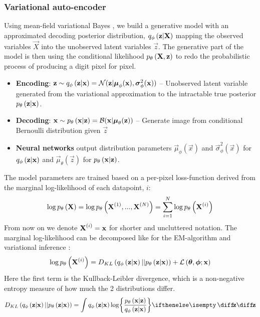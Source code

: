 \subsubsection{Variational auto-encoder}
\label{ssub:vae}

Using mean-field variational Bayes \cite{Kingma2013}, we build a generative model with an approximated decoding posterior distribution, $q_{\phi}\left(\bm{\mathrm{z}}|\bm{\mathrm{X}}\right)$ mapping the observed variables $\vec{X}$ into the unobserved latent variables $\vec{z}$. The generative part of the model is then using the conditional likelihood $p_{\theta}\left(\bm{\mathrm{X}},\bm{\mathrm{z}}\right)$ to redo the probabilistic process of producing a digit pixel for pixel. \\  

\begin{itemize}
	\item \textbf{Encoding}: $\bm{\mathrm{z}} \sim q_{\phi}\left(\bm{\mathrm{z}}|\bm{\mathrm{x}}\right) = \mathcal{N}( \bm{\mathrm{z}}|\bm{\mathrm{\mu}}_\phi(\bm{\mathrm{x}}),\bm{\mathrm{\sigma}}^2_\phi(\bm{\mathrm{x}}))$ -- Unobserved latent variable generated from the variational approximation to the intractable true posterior $p_{\theta}\left(\bm{\mathrm{z}}|\bm{\mathrm{x}}\right)$.
	\item \textbf{Decoding}: $\bm{\mathrm{x}} \sim p_{\theta}\left(\bm{\mathrm{x}}|\bm{\mathrm{z}}\right)=\mathcal{B}( \bm{\mathrm{x}}|\bm{\mathrm{\mu}}_\theta(\bm{\mathrm{z}}))$ -- Generate image from conditional Bernoulli distribution given $\vec{z}$
	\item \textbf{Neural networks} output distribution parameters $\vec{\mu}_\phi(\vec{x})$ and $\vec{\sigma}^2_\phi(\vec{x})$ for $q_{\phi}\left(\bm{\mathrm{z}}|\bm{\mathrm{x}}\right)$ and $\vec{\mu}_\theta(\vec{z})$ for $p_{\theta}\left(\bm{\mathrm{x}}|\bm{\mathrm{z}}\right)$.	
\end{itemize}

The model parameters are trained based on a per-pixel loss-function derived from the marginal log-likelihood of each datapoint, $i$:
\begin{equation}
	\log p_{\theta}\left(\bm{\mathrm{X}}\right) = \log p_{\theta}\left(\bm{\mathrm{X}}^{(1)}, ..., \bm{\mathrm{X}}^{(N)}\right) = \sum^N_{i=1} \log p_{\theta}\left(\bm{\mathrm{X}}^{(i)}\right) 
\end{equation}
From now on we denote $\bm{\mathrm{X}}^{(i)} = \bm{\mathrm{x}}$ for shorter and uncluttered notation.
The marginal log-likelihood can be decomposed like for the EM-algorithm and variational inference \cite[\S10.2]{Bishop2006}:
\begin{equation}
	\log p_{\theta}\left(\bm{\mathrm{X}}^{(i)}\right) = D_{KL}\left( q_{\phi}\left(\bm{\mathrm{z}}|\bm{\mathrm{x}}\right)||p_{\theta}\left(\bm{\mathrm{z}}|\bm{\mathrm{x}}\right)\right) + \mathcal{L}\left(\bm{\mathrm{\theta}},\bm{\mathrm{\phi}};\bm{\mathrm{x}}\right)
\end{equation} 
Here the first term is the Kullback-Leibler divergence, which is a non-negative entropy measure of how much the 2 distributions differ.
\begin{equation}
	D_{KL}\left( \enc{\vec{z}|\vec{x}}||\dec{\vec{z}|\vec{x}}\right) = \int \enc{\vec{z}|\vec{x}} \log \curlies*{ \frac{\dec{\vec{x}|\vec{z}}}{\enc{\vec{z}|\vec{x}} } } \D{\vec{z}}
\end{equation}

